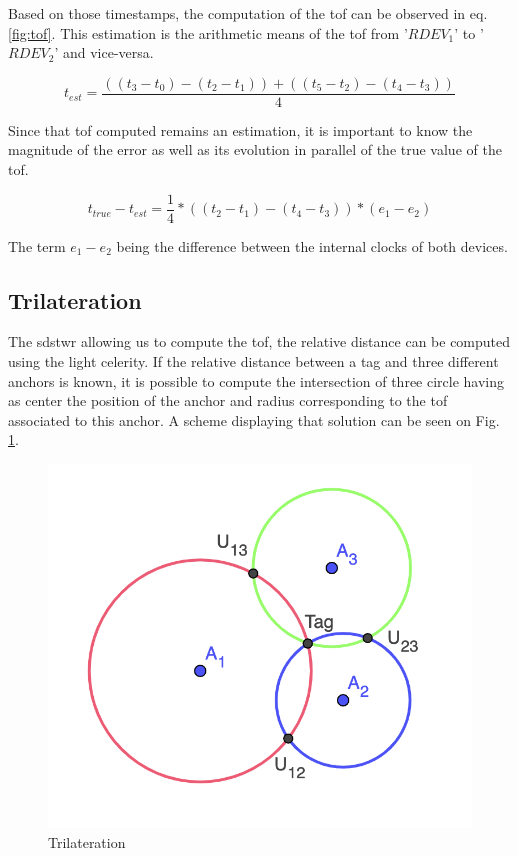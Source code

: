 Based on those timestamps, the computation of the \gls{tof} can be observed in eq. \ref{fig:tof}. This estimation is the arithmetic means of the \gls{tof} from '$RDEV_1$' to '$RDEV_2$' and vice-versa.

\begin{equation}
	t_{est} = \frac{((t_3 - t_0) - (t_2 - t_1)) + ((t_5 - t_2) - (t_4 - t_3))}{4}
\label{fig:tof}
\end{equation}

Since that \gls{tof} computed remains an estimation, it is important to know the magnitude of the error as well as its evolution in parallel of the true value of the \gls{tof}.

\begin{equation}
	t_{true} - t_{est} = \frac{1}{4}*((t_2 - t_1) - (t_4 - t_3))*(e_1 - e_2)
\end{equation}

The term $e_1 - e_2$ being the difference between the internal clocks of both devices. \cite{dalce2011comparison}

\subsection{Trilateration}
\label{tril}

The \gls{sdstwr} allowing us to compute the \gls{tof}, the relative distance can be computed using the light celerity. If the relative distance between a tag and three different anchors is known, it is possible to compute the intersection of three circle having as center the position of the anchor and radius corresponding to the \gls{tof} associated to this anchor. A scheme displaying that solution can be seen on Fig. \ref{fig:trilateration}.

\begin{figure}[H]
\centering
\includegraphics[width=.5\linewidth]{Images/trilateration.png}
\caption{Trilateration \label{fig:trilateration}}
\end{figure}

